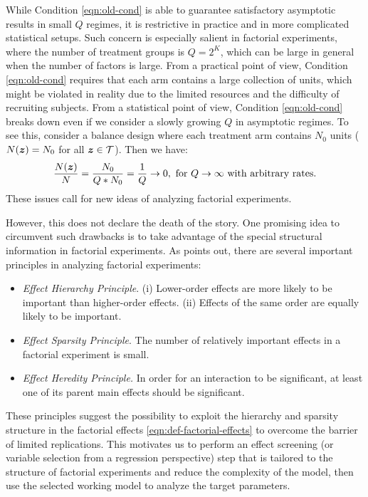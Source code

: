 \documentclass[12pt]{article}
\begin{document}
While Condition \eqref{eqn:old-cond} is able to guarantee satisfactory asymptotic results in small $Q$ regimes, it is restrictive in practice and in more complicated statistical setups. Such concern is  especially salient in factorial experiments, where the number of treatment groups is  $Q = 2^K$, which can be large in general when the number of factors is large. From a practical point of view, Condition \eqref{eqn:old-cond} requires that each arm contains a large collection of units, which might be violated in reality due to the limited resources and the difficulty of recruiting subjects. From a statistical point of view, Condition \eqref{eqn:old-cond} breaks down even if we consider a slowly growing $Q$ in asymptotic regimes.  To see this, consider a balance design where each treatment arm contains $N_0$ units ($N({\boldsymbol{z}}) = N_0$ for all ${\boldsymbol{z}}\in{\mathcal{T}}$). Then we have:
\begin{align*}
    \frac{N({\boldsymbol{z}})}{N} = \frac{N_0}{Q * N_0} = \frac{1}{Q} \to 0, \text{ for $Q\to\infty$ with arbitrary rates}.
\end{align*}
These issues call for new ideas of analyzing factorial experiments.  


However, this does not declare the death of the story. 
One promising idea to circumvent such drawbacks is to take advantage of the special structural information in factorial experiments. As \cite{wu2011experiments} points out, there are several important principles in analyzing factorial experiments:
\begin{itemize}
    \item \textit{Effect Hierarchy Principle}.
(i) Lower-order effects are more likely to be important than higher-order effects. (ii) Effects of the same order are equally likely to be important.
    \item \textit{Effect Sparsity Principle}.
The number of relatively important effects in a factorial experiment is small.
    \item \textit{Effect Heredity Principle.}
In order for an interaction to be significant, at least one of its parent main effects
should be significant. 
\end{itemize}
These principles suggest the possibility to exploit the hierarchy and sparsity structure in the factorial effects \eqref{eqn:def-factorial-effects} to overcome the barrier of limited replications. This motivates us to perform an effect screening (or variable selection from a regression perspective) step that is tailored to the structure of factorial experiments and reduce the complexity of the model, then use the selected working model to analyze the target parameters. 
\end{document}
